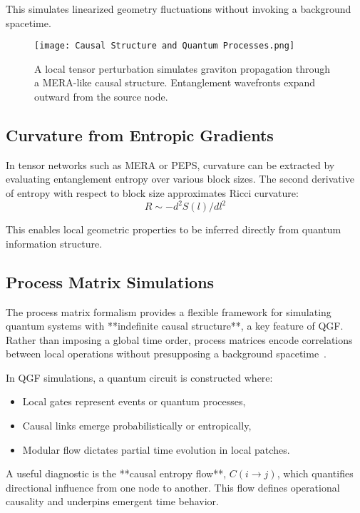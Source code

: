 \documentclass[11pt]{article}
\def\frac#1#2{#1/#2}
\begin{document}
This simulates linearized geometry fluctuations without invoking a background spacetime.
\begin{figure}[H]
\centering
\texttt{[image: Causal Structure and Quantum Processes.png]}
\caption{A local tensor perturbation simulates graviton propagation through a MERA-like causal structure. Entanglement wavefronts expand outward from the source node.}
\label{fig:graviton_causal}
\end{figure}



\subsection{Curvature from Entropic Gradients}

In tensor networks such as MERA or PEPS, curvature can be extracted by evaluating entanglement entropy over various block sizes. The second derivative of entropy with respect to block size approximates Ricci curvature:
\begin{equation}
R \sim -\frac{d^2 S(l)}{dl^2}
\end{equation}

This enables local geometric properties to be inferred directly from quantum information structure.

\subsection{Process Matrix Simulations}

The process matrix formalism provides a flexible framework for simulating quantum systems with **indefinite causal structure**, a key feature of QGF. Rather than imposing a global time order, process matrices encode correlations between local operations without presupposing a background spacetime~\cite{oreshkov2012quantum,chiribella2013quantum,costa2016quantum}.

In QGF simulations, a quantum circuit is constructed where:
\begin{itemize}
    \item Local gates represent events or quantum processes,
    \item Causal links emerge probabilistically or entropically,
    \item Modular flow dictates partial time evolution in local patches.
\end{itemize}

A useful diagnostic is the **causal entropy flow**, \( C(i \rightarrow j) \), which quantifies directional influence from one node to another. This flow defines operational causality and underpins emergent time behavior.
\end{document}
